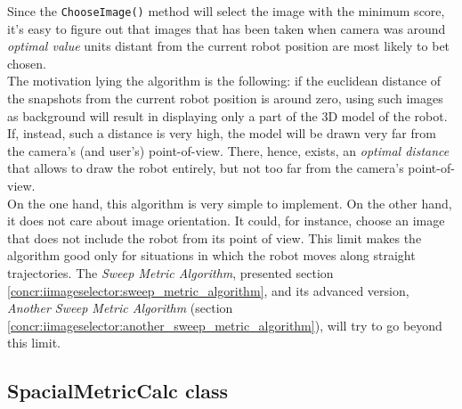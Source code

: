 Since the \texttt{ChooseImage()} method will select the image with 
the minimum score, it's easy to figure out that 
images that has been taken when camera was around 
\textit{optimal value} units distant from the current robot position
are most likely to bet chosen.
\\
The motivation lying the algorithm is the following: 
if the euclidean distance of the snapshots from the current 
robot position is around zero, using such images as background 
will result in displaying only a part of the 3D model of the robot.
If, instead, such a distance is very high, the model will be drawn 
very far from the camera's (and user's) point-of-view.
There, hence, exists, an \textit{optimal distance} that allows 
to draw the robot entirely, but not too far from the camera's 
point-of-view. 
\\
On the one hand, this algorithm is very simple to implement.
On the other hand, it does not care about image orientation. 
It could, for instance, choose an image that does not include 
the robot from its point of view. 
This limit makes the algorithm good only for situations 
in which the robot moves along straight trajectories.
The \textit{Sweep Metric Algorithm}, presented section
\ref{concr:iimageselector:sweep_metric_algorithm}, and its advanced version,
\textit{Another Sweep Metric Algorithm} (section
\ref{concr:iimageselector:another_sweep_metric_algorithm}),
will try to go beyond  this limit.


\subsection{SpacialMetricCalc class}
\label{concr:iimageselector:spacial_metric_class}


